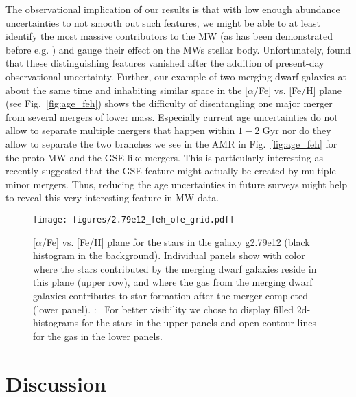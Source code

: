 \documentclass[useAMS,usenatbib]{mnras}
\newcommand{\T}[1]{{\color{blue}{\bf T}:~ #1}}
\begin{document}
The observational implication of our results is that with low enough abundance uncertainties to not smooth out such features, we might be able to at least identify the most massive contributors to the MW (as has been demonstrated before e.g. \citealt{Vincenzo2019, Belokurov2020, Naidu2021, Xiang2022}) and gauge their effect on the MWs stellar body. Unfortunately, \cite{Ratcliffe2022} found that these distinguishing features vanished after the addition of present-day observational uncertainty. Further, our example of two merging dwarf galaxies at about the same time and inhabiting similar space in the [$\alpha$/Fe] vs. [Fe/H] plane (see Fig.~\ref{fig:age_feh}) shows the difficulty of disentangling one major merger from several mergers of lower mass. Especially current age uncertainties do not allow to separate multiple mergers that happen within $1-2$ Gyr nor do they allow to separate the two branches we see in the AMR in Fig.~\ref{fig:age_feh} for the proto-MW and the GSE-like mergers. This is particularly interesting as \cite{Donlon2022} recently suggested that the GSE feature might actually be created by multiple minor mergers. Thus, reducing the age uncertainties in future surveys might help to reveal this very interesting feature in MW data.


\begin{figure*}
    \begin{centering}
        \texttt{[image: figures/2.79e12\_feh\_ofe\_grid.pdf]}
        \vspace*{-1.75em}
        \caption{
            [$\alpha$/Fe] vs. [Fe/H] plane for the stars in the galaxy g2.79e12 (black histogram in the background). Individual panels show with color where the stars contributed by the merging dwarf galaxies reside in this plane (upper row), and where the gas from the merging dwarf galaxies contributes to star formation after the merger completed (lower panel). \T{For better visibility we chose to display filled 2d-histograms for the stars in the upper panels and open contour lines for the gas in the lower panels.} 
        }
        \label{fig:ofe_feh}
    \end{centering}
\end{figure*}


\section{Discussion}
\label{sec:discussion}
\end{document}
